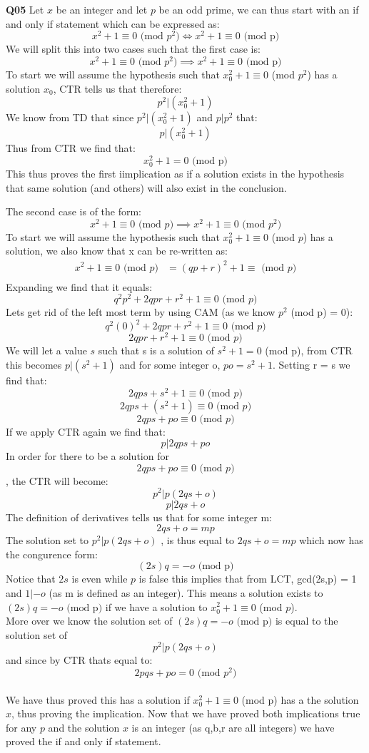 \documentclass[11pt]{article}
\begin{document}
\parindent=0pt
\textbf{Q05} Let $x$ be an integer and let $p$ be an odd prime, we can thus start with an if and only if statement which can be expressed as:
\[ x^2+1 \equiv 0 \text{ (mod $p^2$)}  \iff x^2+1 \equiv 0 \text{ (mod p)}\]
We will split this into two cases such that the first case is:
\[ x^2+1 \equiv 0 \text{ (mod $p^2$)}  \implies x^2+1 \equiv 0 \text{ (mod p)}\]
To start we will assume the hypothesis such that $x_0^2+1 \equiv 0$ (mod $p^2$) has a solution $x_0$, CTR tells us that therefore:
\[ p^2 | (x_0^2 + 1) \]
We know from TD that since  $p^2 | (x_0^2 + 1)$ and $p|p^2$ that:
\[ p | (x_0^2 + 1) \]
Thus from CTR we find that:
\[ x_0^2 + 1 = 0 \text{ (mod p)} \]
This thus proves the first iimplication as if a solution exists in the hypothesis that same solution (and others) will also exist in the conclusion.

The second case is of the form:
\[ x^2+1 \equiv 0 \text{ (mod $p$)}  \implies x^2+1 \equiv 0 \text{ (mod $p^2$)}\]
To start we will assume the hypothesis such that $x_0^2+1 \equiv 0$ (mod $p$) has a solution, we also know that x can be re-written as:
\begin{align*}
x^2+1 \equiv 0 \text{ (mod $p$)} & = (qp+r)^2 + 1  \equiv \text{ (mod $p$)} \\
\end{align*}
Expanding we find that  it equals:
\[ q^2p^2 +2qpr + r^2 + 1  \equiv 0 \text{ (mod $p$)}\]
Lets get rid of the left most term by using CAM (as we know $p^2$ (mod p) = 0):
\[ q^2(0)^2 +2qpr + r^2 + 1  \equiv 0 \text{ (mod $p$)}\]
\[ 2qpr + r^2 + 1  \equiv 0 \text{ (mod $p$)}\]
We will let a value $s$ such that s is a solution of $s^2 + 1 = 0$ (mod p), from CTR this becomes $p|(s^2+1)$ and for some integer o, $po = s^2+1$. Setting r = s we find that:
\[ 2qps + s^2 + 1  \equiv 0 \text{ (mod $p$)}\]
\[ 2qps + (s^2 + 1)  \equiv 0 \text{ (mod $p$)}\]
\[ 2qps +po \equiv 0 \text{ (mod $p$)}\]
If we apply CTR again we find that:
\[ p | 2qps +po \]
In order for there to be a solution for \[ 2qps +po \equiv 0 \text{ (mod $p$)}\], the CTR will become:
\[ p^2 | p(2qs +o) \]
\[ p |2qs +o \]
The definition of derivatives tells us that for some integer m:
\[ 2qs + o = mp \]
The solution set to $p^2 | p(2qs +o)$ , is thus equal to $2qs + o = mp$ which now has the congurence form:
\[(2s)q = -o \text{ (mod p)}\]
Notice that $2s$ is even while $p$ is false this implies that from LCT, gcd(2s,p) = 1 and $1|-o$ (as m is defined as an integer). This means a solution exists to $(2s)q = -o \text{ (mod p)}$ if we have a solution to  $x_0^2+1 \equiv 0$ (mod $p$). \\More over we know the solution set of $(2s)q = -o \text{ (mod p)}$ is equal to the solution set of \[ p^2 | p(2qs +o) \] and since by CTR thats equal to:
\[ 2pqs +po = 0 \text{ (mod $p^2$)} \]\\
We have thus proved this has a solution if  $x_0^2+1 \equiv 0$ (mod p) has a the solution $x$, thus proving the implication. Now that we have proved both implications true for any $p$ and the solution $x$ is an integer (as q,b,r are all integers) we have proved the if and only if statement.
\end{document}
